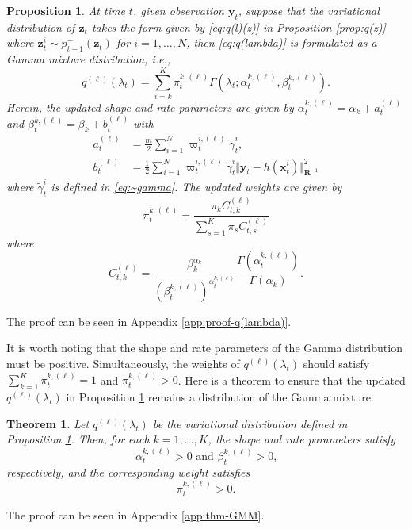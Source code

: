 \documentclass[10pt,twocolumn,twoside]{IEEEtran}
\newtheorem{theorem}{Theorem}
\newtheorem{proposition}{Proposition}
\newcommand{\cm}{\text{,}} %
\newcommand{\fs}{\text{.}} %
\newcommand{\x}{{ \bm{x} }}
\newcommand{\y}{{ \bm{y} }}
\newcommand{\z}{{ \bm{z} }}
\begin{document}
\begin{proposition} \label{prop:q(lambda)}
    At time $t$, given observation $\y_t$, suppose that the variational distribution of $\z_t$ takes the form given by \eqref{eq:q(l)(z)} in Proposition \ref{prop:q(z)} where $\z_t^i\sim p^-_{t-1}(\z_t)$ for $i=1,\dots,N$, then \eqref{eq:q(lambda)} is formulated as a Gamma mixture distribution, i.e.,
    \begin{equation}
        q^{(\ell)}(\lambda_t) = \sum_{i=k}^K\pi_t^{k,(\ell)}\Gamma(\lambda_t;\alpha_t^{k,(\ell)},\beta_t^{k,(\ell)}) \fs
    \end{equation}
    Herein, the updated shape and rate parameters are given by $\alpha_t^{k,(\ell)}=\alpha_k+a_t^{(\ell)}$ and $\beta_t^{k,(\ell)}=\beta_k+b_t^{(\ell)}$ with
    \begin{align}
        a_t^{(\ell)} &= \frac{m}{2}\sum_{i=1}^N\varpi_t^{i,(\ell)}\tilde\gamma_t^i\cm \label{eq:a}\\ 
        b_t^{(\ell)} &= \frac{1}{2}\sum_{i=1}^N\varpi_t^{i,(\ell)}\tilde\gamma_t^i\Vert\y_t-h(\x_t^i)\Vert^2_{\bm{R}^{-1}} \label{eq:b}
    \end{align}
    where $\tilde\gamma_t^i$ is defined in \eqref{eq:~gamma}. The updated weights are given by
    \begin{equation} \label{eq:pi}
        \pi_t^{k,(\ell)} = \frac{\pi_kC_{t,k}^{(\ell)}}{\sum_{s=1}^K\pi_sC_{t,s}^{(\ell)}}
    \end{equation}
    where
    $$
    C_{t,k}^{(\ell)} = \frac{\beta_k^{\alpha_k}}{(\beta_t^{k,(\ell)})^{\alpha_t^{k,(\ell)}}}\frac{\Gamma(\alpha_t^{k,(\ell)})}{\Gamma(\alpha_k)} \fs
    $$
\end{proposition}
\begin{IEEEproof}
    The proof can be seen in Appendix \ref{app:proof-q(lambda)}.
\end{IEEEproof}

It is worth noting that the shape and rate parameters of the Gamma distribution must be positive. Simultaneously, the weights of $q^{(\ell)}(\lambda_t)$ should satisfy $\sum_{k=1}^K\pi_t^{k,(\ell)}=1$ and $\pi_t^{k,(\ell)}>0$. Here is a theorem to ensure that the updated $q^{(\ell)}(\lambda_t)$ in Proposition \ref{prop:q(lambda)} remains a distribution of the Gamma mixture.
\begin{theorem} \label{thm:GMM} %
    Let $q^{(\ell)}(\lambda_t)$ be the variational distribution defined in Proposition \ref{prop:q(lambda)}. Then, for each $k=1,\dots,K$, the shape and rate parameters satisfy
    $$ \alpha_t^{k,(\ell)}>0 \text{~and~} \beta_t^{k,(\ell)}>0\cm $$
    respectively, and the corresponding weight satisfies
    $$ \pi_t^{k,(\ell)} > 0\fs $$
\end{theorem}
\begin{IEEEproof}
The proof can be seen in Appendix \ref{app:thm-GMM}.
\end{IEEEproof}
\end{document}
